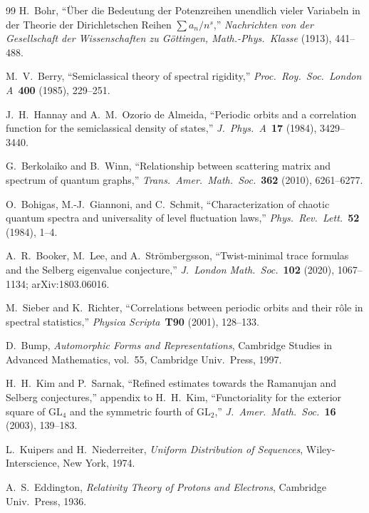 \documentclass[11pt,a4paper]{article}
\theoremstyle{plain}
\theoremstyle{remark}
\begin{document}
\begin{thebibliography}{99}
H.~Bohr,
``\"Uber die Bedeutung der Potenzreihen unendlich vieler
Variabeln in der Theorie der Dirichletschen Reihen
$\sum a_n/n^s$,''
\emph{Nachrichten von der Gesellschaft der Wissenschaften
zu G\"ottingen, Math.-Phys.\ Klasse} (1913), 441--488.

M.~V.~Berry,
``Semiclassical theory of spectral rigidity,''
\emph{Proc.\ Roy.\ Soc.\ London A}\ \textbf{400} (1985), 229--251.

J.~H.~Hannay and A.~M.~Ozorio de Almeida,
``Periodic orbits and a correlation function for the semiclassical
density of states,''
\emph{J.\ Phys.\ A}\ \textbf{17} (1984), 3429--3440.

G.~Berkolaiko and B.~Winn,
``Relationship between scattering matrix and spectrum of quantum
graphs,''
\emph{Trans.\ Amer.\ Math.\ Soc.}\ \textbf{362} (2010), 6261--6277.

O.~Bohigas, M.-J.~Giannoni, and C.~Schmit,
``Characterization of chaotic quantum spectra and universality of
level fluctuation laws,''
\emph{Phys.\ Rev.\ Lett.}\ \textbf{52} (1984), 1--4.

A.~R.~Booker, M.~Lee, and A.~Str\"ombergsson,
``Twist-minimal trace formulas and the Selberg eigenvalue conjecture,''
\emph{J.\ London Math.\ Soc.}\ \textbf{102} (2020), 1067--1134;
arXiv:1803.06016.

M.~Sieber and K.~Richter,
``Correlations between periodic orbits and their r\^ole in spectral statistics,''
\emph{Physica Scripta}\ \textbf{T90} (2001), 128--133.

D.~Bump,
\emph{Automorphic Forms and Representations},
Cambridge Studies in Advanced Mathematics, vol.~55,
Cambridge Univ.\ Press, 1997.

H.~H.~Kim and P.~Sarnak,
``Refined estimates towards the Ramanujan and Selberg conjectures,''
appendix to H.~H.~Kim, ``Functoriality for the exterior square of $\mathrm{GL}_4$
and the symmetric fourth of $\mathrm{GL}_2$,''
\emph{J.\ Amer.\ Math.\ Soc.}\ \textbf{16} (2003), 139--183.

L.~Kuipers and H.~Niederreiter,
\emph{Uniform Distribution of Sequences},
Wiley-Interscience, New York, 1974.

A.~S.~Eddington,
\emph{Relativity Theory of Protons and Electrons},
Cambridge Univ.\ Press, 1936.


\end{thebibliography}
\end{document}
